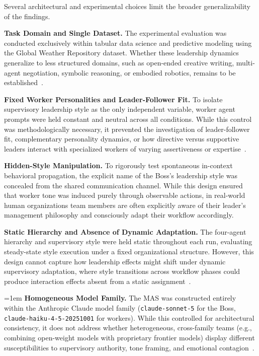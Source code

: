Several architectural and experimental choices limit the broader generalizability of the findings.

\textbf{Task Domain and Single Dataset.}
The experimental evaluation was conducted exclusively within tabular data science and predictive modeling using the Global Weather Repository dataset.
Whether these leadership dynamics generalize to less structured domains, such as open-ended creative writing, multi-agent negotiation, symbolic reasoning, or embodied robotics, remains to be established~\cite{duan2025powerpersonalityhumansimulation, li2023camelcommunicativeagentsmind, chen2023agentversefacilitatingmultiagentcollaboration, guo2024embodiedllmagentslearn}.

\textbf{Fixed Worker Personalities and Leader-Follower Fit.}
To isolate supervisory leadership style as the only independent variable, worker agent prompts were held constant and neutral across all conditions.
While this control was methodologically necessary, it prevented the investigation of leader-follower fit, complementary personality dynamics, or how directive versus supportive leaders interact with specialized workers of varying assertiveness or expertise~\cite{barrick1998personalityteamwork, halfhill2005personalitycomposition, duan2025powerpersonalityhumansimulation, zhang2024exploringcollaborationmechanismsllm}.

\textbf{Hidden-Style Manipulation.}
To rigorously test spontaneous in-context behavioral propagation, the explicit name of the Boss's leadership style was concealed from the shared communication channel.
While this design ensured that worker tone was induced purely through observable actions, in real-world human organizations team members are often explicitly aware of their leader's management philosophy and consciously adapt their workflow accordingly.

\textbf{Static Hierarchy and Absence of Dynamic Adaptation.}
The four-agent hierarchy and supervisory style were held static throughout each run, evaluating steady-state style execution under a fixed organizational structure.
However, this design cannot capture how leadership effects might shift under dynamic supervisory adaptation, where style transitions across workflow phases could produce interaction effects absent from a static assignment~\cite{world6020063, dang2025multiagentcollaborationevolvingorchestration, wang2025agentdropoutdynamicagentelimination}.

{
\emergencystretch=1em
\textbf{Homogeneous Model Family.}
The \ac{MAS} was constructed entirely within the Anthropic Claude model family (\texttt{claude-sonnet-5} for the Boss, \texttt{claude-haiku-4-5-20251001} for workers).
While this controlled for architectural consistency, it does not address whether heterogeneous, cross-family teams (e.g., combining open-weight models with proprietary frontier models) display different susceptibilities to supervisory authority, tone framing, and emotional contagion~\cite{lacava2025openmodelsclosedminds, ashery2025emergentsocial}.
\par}

